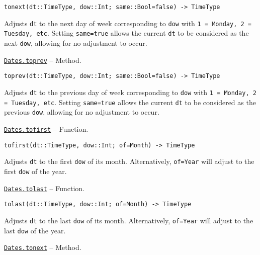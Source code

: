 \begin{adjustwidth}{2em}{0pt}


\begin{verbatim}
tonext(dt::TimeType, dow::Int; same::Bool=false) -> TimeType
\end{verbatim}

Adjusts \texttt{dt} to the next day of week corresponding to \texttt{dow} with \texttt{1 = Monday, 2 = Tuesday, etc}. Setting \texttt{same=true} allows the current \texttt{dt} to be considered as the next \texttt{dow}, allowing for no adjustment to occur.



\end{adjustwidth}
\hypertarget{5295237512711135506}{} 
\hyperlink{5295237512711135506}{\texttt{Dates.toprev}}  -- {Method.}

\begin{adjustwidth}{2em}{0pt}


\begin{verbatim}
toprev(dt::TimeType, dow::Int; same::Bool=false) -> TimeType
\end{verbatim}

Adjusts \texttt{dt} to the previous day of week corresponding to \texttt{dow} with \texttt{1 = Monday, 2 = Tuesday, etc}. Setting \texttt{same=true} allows the current \texttt{dt} to be considered as the previous \texttt{dow}, allowing for no adjustment to occur.



\end{adjustwidth}
\hypertarget{14392816409484181570}{} 
\hyperlink{14392816409484181570}{\texttt{Dates.tofirst}}  -- {Function.}

\begin{adjustwidth}{2em}{0pt}


\begin{verbatim}
tofirst(dt::TimeType, dow::Int; of=Month) -> TimeType
\end{verbatim}

Adjusts \texttt{dt} to the first \texttt{dow} of its month. Alternatively, \texttt{of=Year} will adjust to the first \texttt{dow} of the year.



\end{adjustwidth}
\hypertarget{18080067486232724602}{} 
\hyperlink{18080067486232724602}{\texttt{Dates.tolast}}  -- {Function.}

\begin{adjustwidth}{2em}{0pt}


\begin{verbatim}
tolast(dt::TimeType, dow::Int; of=Month) -> TimeType
\end{verbatim}

Adjusts \texttt{dt} to the last \texttt{dow} of its month. Alternatively, \texttt{of=Year} will adjust to the last \texttt{dow} of the year.



\end{adjustwidth}
\hypertarget{4241078503475048595}{} 
\hyperlink{4241078503475048595}{\texttt{Dates.tonext}}  -- {Method.}

